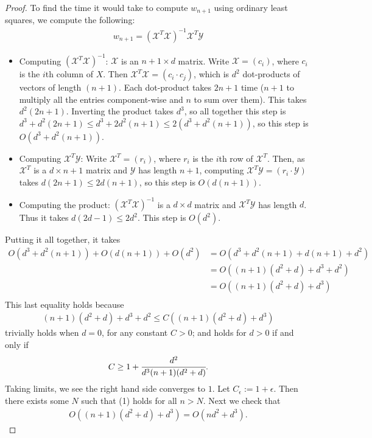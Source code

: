 \documentclass[12pt]{article}
\newcommand{\X}{\mathcal{X}}
\newcommand{\Y}{\mathcal{Y}}
\begin{document}
\begin{proof}
\bigbreak
  To find the time it would take to compute $w_{n+1}$ using ordinary least squares, we compute the following:
\begin{align*}
  w_{n+1} = (\X^T\X)^{-1} \X^T \Y
\end{align*}
\begin{itemize}
\item
  Computing $(\X^T\X)^{-1}$: $\X$ is an $n+1 \times d$ matrix. Write $\X=(c_i)$, where $c_i$ is the $i$th column of $X$. Then $\X^T\X=(c_i\cdot c_j)$, which
  is $d^2$ dot-products of vectors of length $(n+1)$. Each dot-product takes $2n+1$ time ($n+1$ to multiply all the entries component-wise and $n$ to sum over them). This takes $d^2(2n+1)$. Inverting the product takes $d^3$, so all together this step is $d^3 + d^2(2n+1) \leq d^3 + 2d^2(n+1) \leq 2(d^3 + d^2(n+1))$, so this step is
  $O(d^3 + d^2(n+1))$.
\item
  Computing $\X^T\Y$: Write $\X^T = (r_i)$, where $r_i$ is the $i$th row of $\X^T$. Then, as $\X^T$ is a $d \times n+1$ matrix and $\Y$ has length $n+1$, computing $\X^T\Y = (r_i \cdot \Y)$ takes $d(2n+1) \leq 2d(n+1)$, so this step is $O(d(n+1))$.
\item
  Computing the product: $(\X^T\X)^{-1}$ is a $d \times d$ matrix and $\X^T\Y$ has length $d$. Thus it takes $d(2d-1) \leq 2d^2$. This step is $O(d^2)$.
\end{itemize}
Putting it all together, it takes
\begin{align*}
  O(d^3 + d^2(n+1)) + O(d(n+1)) + O(d^2) &= O(d^3 + d^2(n+1) + d(n+1) + d^2) \\
  &= O((n+1)(d^2 + d) + d^3 + d^2) \\
  &= O((n+1)(d^2 + d) + d^3) \\
\end{align*}
This last equality holds because
\begin{align}
  (n+1)(d^2+d) + d^3 + d^2 \leq C((n+1)(d^2+d)+d^3)
\end{align}
trivially holds when $d=0$, for any constant $C>0$; and holds for $d > 0$ if and only if
\begin{align*}
  C \geq 1 + \cfrac{d^2}{d^3(n+1)(d^2+d)}.
\end{align*}
Taking limits, we see the right hand side converges to $1$. Let $C_{\epsilon} := 1+\epsilon$. Then there exists some $N$ such that (1) holds for all $n > N$.
\bigbreak
  Next we check that
\begin{align*}
   O((n+1)(d^2 + d) + d^3) = O(nd^2 + d^3).
\end{align*}

\end{proof}
\end{document}

